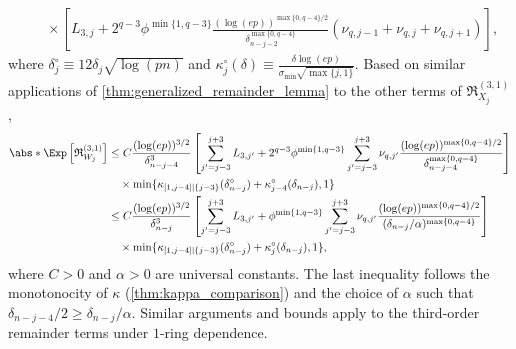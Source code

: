 \documentclass[aos]{imsart}
\begin{document}
\begin{appendix}
\begin{equation*}
\begin{aligned}
    & \quad \times \left[ 
        L_{3,j}
        + 2^{q-3} \phi^{\min\{1,q-3\}} \frac{(\log(ep))^{\max\{0,q-4\}/2}}{\delta^{\max\{0,q-4\}}_{n-j-2}} (\nu_{q,j-1} + \nu_{q,j} + \nu_{q,j+1})
    \right],
\end{aligned}
\end{equation*}
where $\delta^\circ_{j} \equiv 12 \delta_{j} \sqrt{\log(pn)}$ and $\kappa^\circ_{j}(\delta) \equiv \frac{\delta \log(ep)}{\sigma_{\min} \sqrt{\max\{j, 1\}}}$.
Based on similar applications of \cref{thm:generalized_remainder_lemma} to the other terms of $\mathfrak{R}^{(3,1)}_{X_j}$, %
\begin{equation*}
\begin{aligned}
    \abs*{\Exp \left[ \mathfrak{R}_{W_j}^{(3,1)} \right]} 
    & \leq C \frac{(\log(ep))^{3/2}}{\delta_{n-j-4}^3} \left[ 
        \sum_{j'=j-3}^{j+3} L_{3,j'} 
        + 2^{q-3} \phi^{\min\{1,q-3\}} \sum_{j'=j-3}^{j+3} \nu_{q,j'} \frac{(\log(ep))^{\max\{0,q-4\}/2}}{\delta^{\max\{0,q-4\}}_{n-j-4}}
    \right] \\
    & \quad \times \min\{\kappa_{[1,j-4]|\{j-3\}}(\delta_{n-j}^\circ) + \kappa^\circ_{j-4}(\delta_{n-j}), 1\} \\
    & \leq C \frac{(\log(ep))^{3/2}}{\delta_{n-j}^3} \left[ 
        \sum_{j'=j-3}^{j+3} L_{3,j'} 
        + \phi^{\min\{1,q-3\}} \sum_{j'=j-3}^{j+3} \nu_{q,j'} \frac{(\log(ep))^{\max\{0,q-4\}/2}}{(\delta_{n-j}/\alpha)^{\max\{0,q-4\}}}
    \right] \\
    & \quad \times \min\{\kappa_{[1,j-4]|\{j-3\}}(\delta_{n-j}^\circ) + \kappa^\circ_{j}(\delta_{n-j}), 1\},
\end{aligned}
\end{equation*}
where $C > 0$ and $\alpha > 0$ are universal constants.
The last inequality follows the monotonocity of $\kappa$ (\cref{thm:kappa_comparison}) and the choice of $\alpha$ such that $\delta_{n-j-4}/2 \geq \delta_{n-j}/\alpha$.
Similar arguments and bounds apply to the third-order remainder terms under $1$-ring dependence.


\end{appendix}
\end{document}
